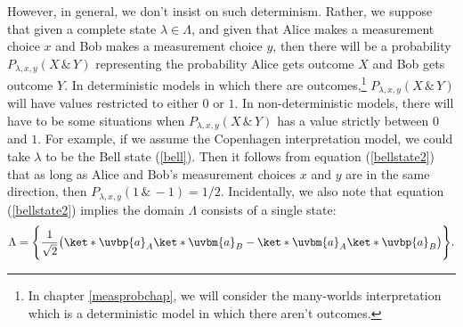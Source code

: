\documentclass[12pt]{report}
\providecommand{\DIFadd}[1]{{\protect\color{blue}\uwave{#1}}} %
\providecommand{\DIFdel}[1]{{\protect\color{red}\sout{#1}}}                      %
\providecommand{\DIFaddbegin}{} %
\providecommand{\DIFaddend}{} %
\providecommand{\DIFdelbegin}{} %
\providecommand{\DIFdelend}{} %
\begin{document}
However, in general, we don't insist on such determinism. Rather, we suppose that given a complete state $\lambda\in\Lambda$, and given that Alice makes a measurement choice $x$ and Bob makes a measurement choice $y$, then there will be a probability \DIFdelbegin \DIFdel{$P_{\lambda,x,y}(X \,\&\, Y)$ }\DIFdelend \DIFaddbegin \DIFadd{$P_{\lambda,x,y}(X , Y)$ }\DIFaddend %
\DIFdelbegin %
\DIFdelend \DIFaddbegin {}\DIFaddend %
representing the probability Alice gets outcome $X$ and Bob gets outcome $Y$. In deterministic models in which there are outcomes,\footnote{In chapter \ref{measprobchap}, we will consider the many-worlds interpretation which is a deterministic model in which there aren't outcomes.} \DIFdelbegin \DIFdel{$P_{\lambda,x,y}(X \,\&\, Y)$ }\DIFdelend \DIFaddbegin \DIFadd{$P_{\lambda,x,y}(X , Y)$ }\DIFaddend will have values restricted to either $0$ or $1$. In non-deterministic models, there will have to be some situations when \DIFdelbegin \DIFdel{$P_{\lambda,x,y}(X\,\&\, Y)$ }\DIFdelend \DIFaddbegin \DIFadd{$P_{\lambda,x,y}(X, Y)$ }\DIFaddend has a value strictly between $0$ and $1$. For example, if we assume the Copenhagen interpretation model, we could take $\lambda$ to be the Bell state (\ref{bell}). Then it follows from equation (\ref{bellstate2}) that as long as Alice and Bob's measurement choices $x$ and $y$ are in the same direction, then \DIFdelbegin \DIFdel{$P_{\lambda,x,y}(1\,\&\,-1)=1/2$}\DIFdelend \DIFaddbegin \DIFadd{$P_{\lambda,x,y}(1,-1)=1/2$}\DIFaddend . Incidentally, we also note that equation (\ref{bellstate2}) implies the domain $\Lambda$ consists of a single state:
\begin{equation}\label{quantumLambda}
\Lambda=\Bigg\{\frac{1}{\sqrt{2}}\big(\ket*{\uvbp{a}}_A\ket*{\uvbm{a}}_B-\ket*{\uvbm{a}}_A\ket*{\uvbp{a}}_B\big)\Bigg\}.
\end{equation}
\end{document}
